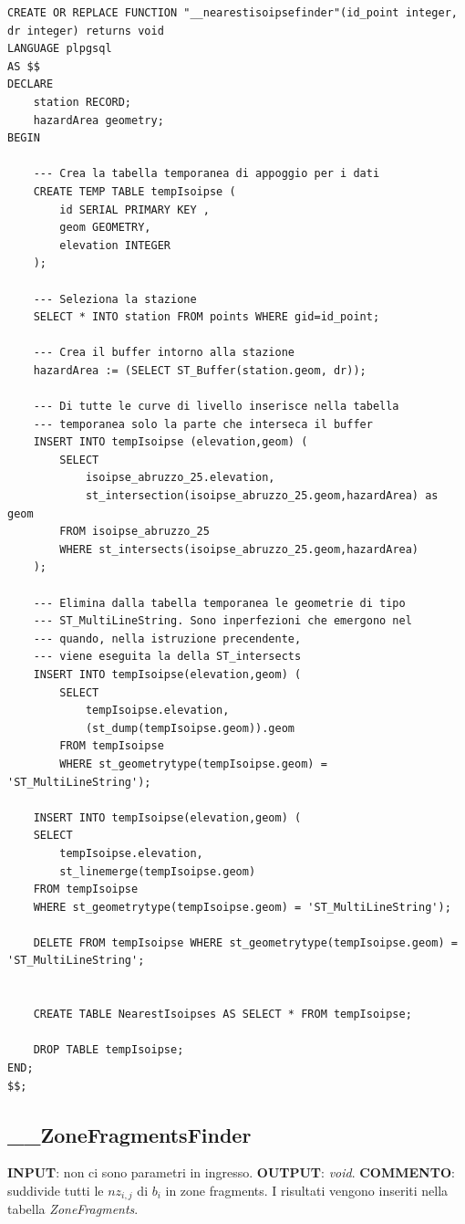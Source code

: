 \begin{lstlisting}[style = mystyle]
CREATE OR REPLACE FUNCTION "__nearestisoipsefinder"(id_point integer, dr integer) returns void
LANGUAGE plpgsql
AS $$
DECLARE
	station RECORD;
	hazardArea geometry;
BEGIN
	
	--- Crea la tabella temporanea di appoggio per i dati
	CREATE TEMP TABLE tempIsoipse (
		id SERIAL PRIMARY KEY ,
		geom GEOMETRY,
		elevation INTEGER
	);
	
	--- Seleziona la stazione 
	SELECT * INTO station FROM points WHERE gid=id_point;
	
	--- Crea il buffer intorno alla stazione
	hazardArea := (SELECT ST_Buffer(station.geom, dr));

	--- Di tutte le curve di livello inserisce nella tabella 
	--- temporanea solo la parte che interseca il buffer 
	INSERT INTO tempIsoipse (elevation,geom) (
		SELECT
			isoipse_abruzzo_25.elevation,
			st_intersection(isoipse_abruzzo_25.geom,hazardArea) as geom
		FROM isoipse_abruzzo_25 
		WHERE st_intersects(isoipse_abruzzo_25.geom,hazardArea)
	);

	--- Elimina dalla tabella temporanea le geometrie di tipo 
	--- ST_MultiLineString. Sono inperfezioni che emergono nel 
	--- quando, nella istruzione precendente, 
	--- viene eseguita la della ST_intersects
	INSERT INTO tempIsoipse(elevation,geom) (
		SELECT 
			tempIsoipse.elevation,
			(st_dump(tempIsoipse.geom)).geom 
		FROM tempIsoipse 
		WHERE st_geometrytype(tempIsoipse.geom) = 'ST_MultiLineString');
		
	INSERT INTO tempIsoipse(elevation,geom) (
	SELECT 
		tempIsoipse.elevation, 
		st_linemerge(tempIsoipse.geom) 
	FROM tempIsoipse 
	WHERE st_geometrytype(tempIsoipse.geom) = 'ST_MultiLineString');

	DELETE FROM tempIsoipse WHERE st_geometrytype(tempIsoipse.geom) = 'ST_MultiLineString';


	CREATE TABLE NearestIsoipses AS SELECT * FROM tempIsoipse;

	DROP TABLE tempIsoipse;
END;
$$;
\end{lstlisting}

\subsection{\_\_ZoneFragmentsFinder}
\textbf{INPUT}: non ci sono parametri in ingresso. \newline
\textbf{OUTPUT}: \textit{void}. \newline
\textbf{COMMENTO}: suddivide tutti le $nz_{i,j}$ di $b_i$ in zone fragments. I risultati vengono inseriti nella tabella \textit{ZoneFragments}.

